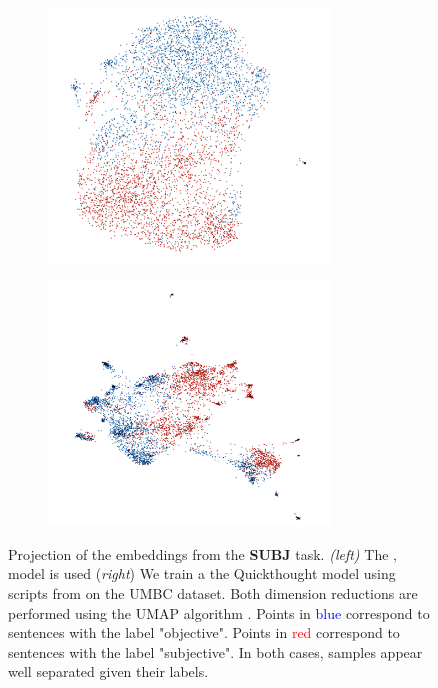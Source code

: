 \begin{figure}[htb!]
\centering
\begin{subfigure}[b]{8cm}
    \centering
    \includegraphics[width=7.5cm]{images/SUBJ_MV_DEP_CONST_no_sphere.png}
    \label{fig:sub1}
\end{subfigure}
\hfill
\begin{subfigure}[b]{8cm}  
    \centering 
    \includegraphics[width=7.5cm]{images/SUBJ_QT_no_sphere.png}
    \label{fig:sub2}
\end{subfigure}
\caption{Projection of the embeddings from the \textbf{SUBJ} task. \textit{(left)} The \dep, \const model is used (\textit{right}) We train a the Quickthought model using scripts from \parencite{logeswaran_18} on the UMBC dataset. Both dimension reductions are performed using the UMAP algorithm \parencite{mcinnes_18}. Points in \textcolor{blue}{blue} correspond to sentences with the label "objective". Points in \textcolor{red}{red} correspond to sentences with the label "subjective". In both cases, samples appear well separated given their labels.}
\end{figure}

